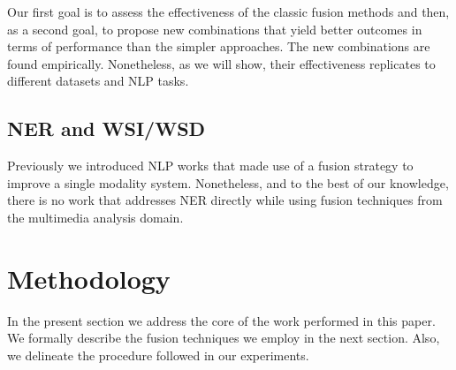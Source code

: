 \documentclass{llncs}
\begin{document}
Our first goal is to assess the effectiveness of the classic fusion methods and then, as a second goal, to propose new combinations that yield better outcomes in terms of performance than the simpler approaches. The new combinations are found empirically. Nonetheless, as we will show, their effectiveness replicates to different datasets and NLP tasks. 
%
%


\subsection{NER and WSI/WSD}
Previously we introduced NLP works that made use of a fusion strategy to improve a single modality system. Nonetheless, and to the best of our knowledge, there is no work that addresses NER directly while using fusion techniques from the multimedia analysis domain.

\section{Methodology}
In the present section we address the core of the work performed in this paper.
We formally describe the fusion techniques we employ in the next section. Also, we  delineate the procedure followed in our experiments. 


\end{document}

